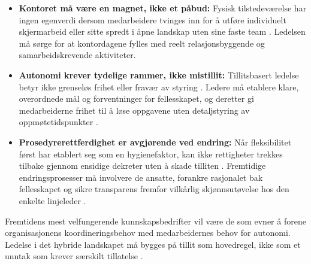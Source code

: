 \begin{itemize}
    \item \textbf{Kontoret må være en magnet, ikke et påbud:} Fysisk tilstedeværelse har ingen egenverdi dersom medarbeidere tvinges inn for å utføre individuelt skjermarbeid eller sitte spredt i åpne landskap uten sine faste team \parencite{biernat2026}. Ledelsen må sørge for at kontordagene fylles med reelt relasjonsbyggende og samarbeidskrevende aktiviteter.
    \item \textbf{Autonomi krever tydelige rammer, ikke mistillit:} Tillitsbasert ledelse betyr ikke grenseløs frihet eller fravær av styring \parencite{myhre2026}. Ledere må etablere klare, overordnede mål og forventninger for fellesskapet, og deretter gi medarbeiderne frihet til å løse oppgavene uten detaljstyring av oppmøtetidspunkter \parencite{myhre2026}.
    \item \textbf{Prosedyrerettferdighet er avgjørende ved endring:} Når fleksibilitet først har etablert seg som en hygienefaktor, kan ikke rettigheter trekkes tilbake gjennom ensidige dekreter uten å skade tilliten \parencite{biernat2026, ingebrigtsen_dnv_2026}. Fremtidige endringsprosesser må involvere de ansatte, forankre rasjonalet bak fellesskapet og sikre transparens fremfor vilkårlig skjønnsutøvelse hos den enkelte linjeleder \parencite{biernat2026}.
\end{itemize}

Fremtidens mest velfungerende kunnskapsbedrifter vil være de som evner å forene organisasjonens koordineringsbehov med medarbeidernes behov for autonomi. Ledelse i det hybride landskapet må bygges på tillit som hovedregel, ikke som et unntak som krever særskilt tillatelse \parencite{biernat2026, ingebrigtsen_vend_2026}.
